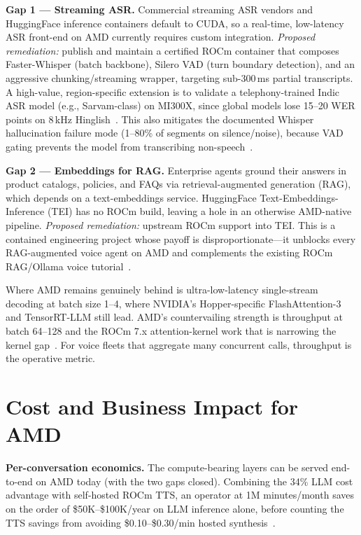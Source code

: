 \documentclass[blind]{gtac}
\begin{document}
\textbf{Gap 1 --- Streaming ASR.} Commercial streaming ASR vendors and HuggingFace inference containers default to CUDA, so a real-time, low-latency ASR front-end on AMD currently requires custom integration. \emph{Proposed remediation:} publish and maintain a certified ROCm container that composes Faster-Whisper (batch backbone), Silero VAD (turn boundary detection), and an aggressive chunking/streaming wrapper, targeting sub-300\,ms partial transcripts. A high-value, region-specific extension is to validate a telephony-trained Indic ASR model (e.g., Sarvam-class) on MI300X, since global models lose 15--20 WER points on 8\,kHz Hinglish~\cite{sarvam_asr,indic_asr}. This also mitigates the documented Whisper hallucination failure mode (1--80\% of segments on silence/noise), because VAD gating prevents the model from transcribing non-speech~\cite{facct_whisper}.

\textbf{Gap 2 --- Embeddings for RAG.} Enterprise agents ground their answers in product catalogs, policies, and FAQs via retrieval-augmented generation (RAG), which depends on a text-embeddings service. HuggingFace Text-Embeddings-Inference (TEI) has no ROCm build, leaving a hole in an otherwise AMD-native pipeline. \emph{Proposed remediation:} upstream ROCm support into TEI. This is a contained engineering project whose payoff is disproportionate---it unblocks every RAG-augmented voice agent on AMD and complements the existing ROCm RAG/Ollama voice tutorial~\cite{rocm_voice_rag}.

Where AMD remains genuinely behind is ultra-low-latency single-stream decoding at batch size 1--4, where NVIDIA's Hopper-specific FlashAttention-3 and TensorRT-LLM still lead. AMD's countervailing strength is throughput at batch 64--128 and the ROCm 7.x attention-kernel work that is narrowing the kernel gap~\cite{vllm_rocm}. For voice fleets that aggregate many concurrent calls, throughput is the operative metric.

\section{Cost and Business Impact for AMD}
\label{sec:impact}
\textbf{Per-conversation economics.} The compute-bearing layers can be served end-to-end on AMD today (with the two gaps closed). Combining the 34\% LLM cost advantage with self-hosted ROCm TTS, an operator at 1M minutes/month saves on the order of \$50K--\$100K/year on LLM inference alone, before counting the TTS savings from avoiding \$0.10--\$0.30/min hosted synthesis~\cite{raftlabs_cost}.
\end{document}
